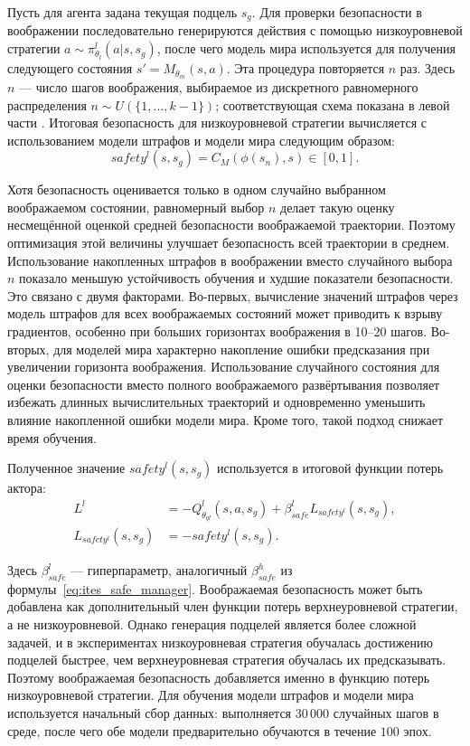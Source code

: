 Пусть для агента задана текущая подцель $s_g$. Для проверки безопасности в воображении последовательно генерируются действия с помощью низкоуровневой стратегии $a \sim \pi^l_{\theta_l}(a|s, s_g)$, после чего модель мира используется для получения следующего состояния $s' = M_{\theta_m}(s, a)$. Эта процедура повторяется $n$ раз. Здесь $n$ — число шагов воображения, выбираемое из дискретного равномерного распределения $n \sim U(\{1,\ldots,k-1\})$; соответствующая схема показана в левой части . Итоговая безопасность для низкоуровневой стратегии вычисляется с использованием модели штрафов и модели мира следующим образом:
\begin{equation}
    \label{eq:ites_low_level_safety}
    safety^l(s, s_g)
    =
    C_{M}(\phi(s_n), s)
    \in [0, 1].
\end{equation}

Хотя безопасность оценивается только в одном случайно выбранном воображаемом состоянии, равномерный выбор $n$ делает такую оценку несмещённой оценкой средней безопасности воображаемой траектории. Поэтому оптимизация этой величины улучшает безопасность всей траектории в среднем. Использование накопленных штрафов в воображении вместо случайного выбора $n$ показало меньшую устойчивость обучения и худшие показатели безопасности. Это связано с двумя факторами. Во-первых, вычисление значений штрафов через модель штрафов для всех воображаемых состояний может приводить к взрыву градиентов, особенно при больших горизонтах воображения в 10--20 шагов. Во-вторых, для моделей мира характерно накопление ошибки предсказания при увеличении горизонта воображения. Использование случайного состояния для оценки безопасности вместо полного воображаемого развёртывания позволяет избежать длинных вычислительных траекторий и одновременно уменьшить влияние накопленной ошибки модели мира. Кроме того, такой подход снижает время обучения.

Полученное значение $safety^l(s, s_g)$ используется в итоговой функции потерь актора:
\begin{equation}
    \label{eq:ites_low_level_policy_update}
    \begin{split}
    L^l
    &= -Q^l_{\theta_{ql}}(s, a, s_g)
    + \beta^l_{safe} L_{safety^l}(s, s_g), \\
    L_{safety^l}(s, s_g)
    &= -safety^l(s, s_g).
    \end{split}
\end{equation}

Здесь $\beta^l_{safe}$ — гиперпараметр, аналогичный $\beta^h_{safe}$ из формулы~\ref{eq:ites_safe_manager}. Воображаемая безопасность может быть добавлена как дополнительный член функции потерь верхнеуровневой стратегии, а не низкоуровневой. Однако генерация подцелей является более сложной задачей, и в экспериментах низкоуровневая стратегия обучалась достижению подцелей быстрее, чем верхнеуровневая стратегия обучалась их предсказывать. Поэтому воображаемая безопасность добавляется именно в функцию потерь низкоуровневой стратегии. Для обучения модели штрафов и модели мира используется начальный сбор данных: выполняется $30\,000$ случайных шагов в среде, после чего обе модели предварительно обучаются в течение $100$ эпох.

